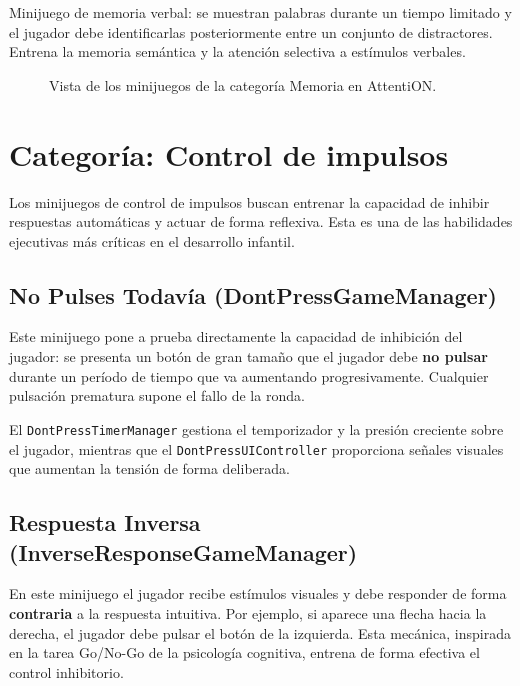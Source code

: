 \documentclass[12pt, a4paper]{report}
\begin{document}
Minijuego de memoria verbal: se muestran palabras durante un tiempo limitado
y el jugador debe identificarlas posteriormente entre un conjunto de
distractores. Entrena la memoria semántica y la atención selectiva a estímulos
verbales.

\begin{figure}[H]
  \centering
  \caption{Vista de los minijuegos de la categoría Memoria en AttentiON.}
  \label{fig:memoria}
\end{figure}

\section{Categoría: Control de impulsos}

Los minijuegos de control de impulsos buscan entrenar la capacidad de inhibir
respuestas automáticas y actuar de forma reflexiva. Esta es una de las
habilidades ejecutivas más críticas en el desarrollo infantil.

\subsection{No Pulses Todavía (DontPressGameManager)}

Este minijuego pone a prueba directamente la capacidad de inhibición del
jugador: se presenta un botón de gran tamaño que el jugador debe
\textbf{no pulsar} durante un período de tiempo que va aumentando
progresivamente. Cualquier pulsación prematura supone el fallo de la ronda.

El \texttt{DontPressTimerManager} gestiona el temporizador y la presión
creciente sobre el jugador, mientras que el \texttt{DontPressUIController}
proporciona señales visuales que aumentan la tensión de forma deliberada.

\subsection{Respuesta Inversa (InverseResponseGameManager)}

En este minijuego el jugador recibe estímulos visuales y debe responder de
forma \textbf{contraria} a la respuesta intuitiva. Por ejemplo, si aparece
una flecha hacia la derecha, el jugador debe pulsar el botón de la izquierda.
Esta mecánica, inspirada en la tarea Go/No-Go de la psicología cognitiva,
entrena de forma efectiva el control inhibitorio.
\end{document}
